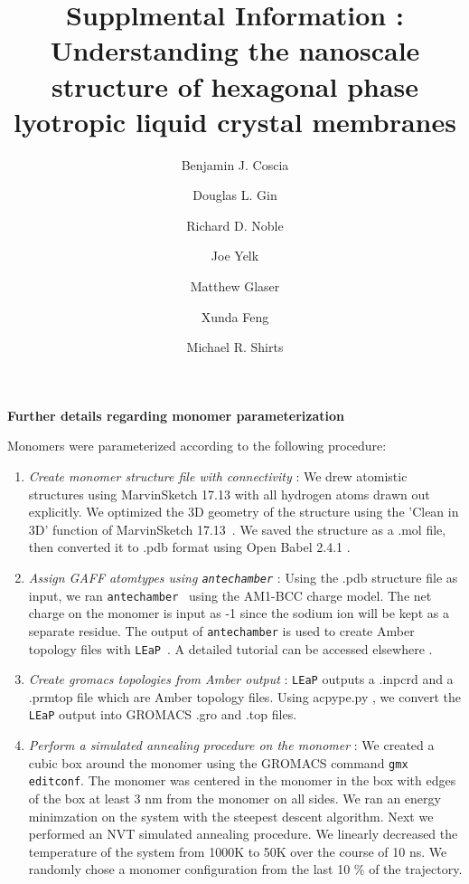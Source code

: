 \documentclass{article}
\title{Supplmental Information : Understanding the nanoscale structure of hexagonal phase lyotropic liquid crystal membranes}
\author{Benjamin J. Coscia \and Douglas L. Gin \and Richard D. Noble \and Joe Yelk \and Matthew Glaser \and Xunda Feng \and Michael R. Shirts}
\begin{document}
  
  \graphicspath{{./figures/}}  %
  \maketitle

  \noindent
  \begingroup
	\fontsize{14pt}{14pt}\selectfont
	\textbf{Further details regarding monomer parameterization} 
  \endgroup
 
  \vspace{1em}
  Monomers were parameterized according to the following procedure:
  \begin{enumerate}
	\item \textit{Create monomer structure file with connectivity} : We
	drew atomistic structures using MarvinSketch 17.13 with all hydrogen atoms
	drawn out explicitly. We optimized the 3D geometry of the structure using the
	'Clean in 3D' function of MarvinSketch 17.13~\cite{chemaxon_marvinsketch_2017}.
	We saved the structure as a .mol file, then converted it to .pdb format using
	Open Babel 2.4.1 \cite{oboyle_open_2011,noauthor_open_nodate}. 
	\item \textit{Assign GAFF atomtypes using \texttt{antechamber}} : Using the .pdb
	structure file as input, we ran \texttt{antechamber}~\cite{wang_automatic_2006}
	using the AM1-BCC charge model. The net charge on the monomer is input as -1
	since the sodium ion will be kept as a separate residue. The output of
	\texttt{antechamber} is used to create Amber topology files with
	\texttt{LEaP}~\cite{case_ambertools16_2016}. A detailed tutorial can be accessed
	elsewhere \cite{walker_antechamber_nodate}.
	\item \textit{Create gromacs topologies from Amber output} : \texttt{LEaP}
	outputs a .inpcrd and a .prmtop file which are Amber topology files. Using
	acpype.py \cite{sousa_da_silva_acpype_2012}, we convert the \texttt{LEaP}
	output into GROMACS .gro and .top files. 
	\item \textit{Perform a simulated annealing procedure on the monomer} :
	We created a cubic box around the monomer using the GROMACS command \texttt{gmx
	editconf}. The monomer was centered in the monomer in the box with edges of the
	box at least 3 nm from the monomer on all sides. We ran an energy minimzation
	on the system with the steepest descent algorithm.  Next we performed an NVT
	simulated annealing procedure. We linearly decreased the temperature of the
	system from 1000K to 50K over the course of 10 ns. We randomly chose a monomer
	configuration from the last 10 \% of the trajectory. 

\end{enumerate}
\end{document}
